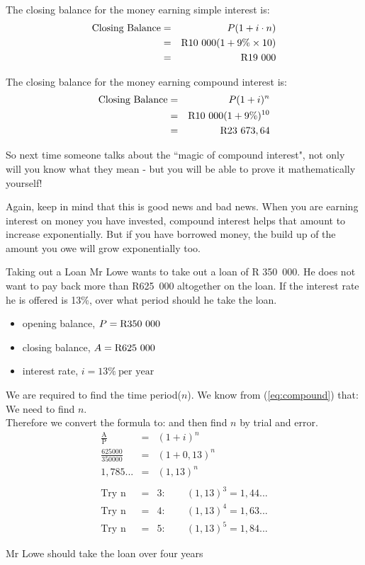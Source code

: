 \documentclass[10pt,a4paper,titlepage,twoside,openright]{report}
\begin{document}
The closing balance for the money earning simple interest is:
\begin{eqnarray*}
\mbox{Closing Balance} &=& P (1 + i\cdot n)\\
&=& \rm{R}10~000 (1 + 9\% \times 10)\\
&=& \rm{R}19~000
\end{eqnarray*}

The closing balance for the money earning compound interest is:
\begin{eqnarray*}
\mbox{Closing Balance} &=& P (1 + i)^n\\
&=& \rm{R}10~000 (1 + 9\%)^{10}\\
&=& \rm{R}23~673,64
\end{eqnarray*}

So next time someone talks about the ``magic of compound interest", not only will you know what they mean - but you will be able to prove it mathematically yourself!

Again, keep in mind that this is good news and bad news. When you are earning interest on money you have invested, compound interest helps that amount to increase exponentially. But if you have borrowed money, the build up of the amount you owe will grow exponentially too.

\begin{wex}{Taking out a Loan}
{Mr Lowe wants to take out a loan of R 350~000. 
He does not want to pay back more than R625~000 altogether on the loan.  If the
interest rate he is offered is 13\%, over what period should he take the loan.}
{
\begin{itemize}[topsep=0ex, partopsep=\parskip,itemsep=\parskip]
\item{opening balance, $P=\rm{R}350~000$}
\item{closing balance, $A=\rm{R}625~000$}
\item{interest rate, $i=13\%~\mbox{per year}$}
\end{itemize}
\vspace{0.5cm}
We are required to find the time period($n$).
We know from (\ref{eq:compound}) that:
We need to find $n$.\\
Therefore we convert the formula to:
and then find $n$ by trial and error.
\begin{eqnarray*}
\frac{\mbox{A}}{\mbox{P}}&=&(1 + i)^n\\
\frac{625000}{350000}&=&(1 + 0,13)^{n}\\
1,785...&=& (1,13)^n\\
&&\\
\mbox{Try n}&=&3: \quad\quad  (1,13)^3 = 1,44...\\
\mbox{Try n}&=&4: \quad\quad  (1,13)^4 = 1,63...\\
\mbox{Try n}&=&5: \quad\quad  (1,13)^5 = 1,84...
\end{eqnarray*}
}
Mr Lowe should take the loan over four years
\end{wex}
\end{document}
